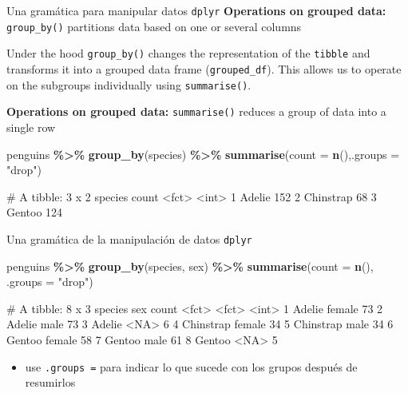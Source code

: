\documentclass[
  ignorenonframetext,
  aspectratio=169]{beamer}
\newenvironment{Shaded}{\begin{snugshade}}{\end{snugshade}}
\newcommand{\AttributeTok}[1]{\textcolor[rgb]{0.13,0.29,0.53}{#1}}
\newcommand{\FunctionTok}[1]{\textcolor[rgb]{0.13,0.29,0.53}{\textbf{#1}}}
\newcommand{\NormalTok}[1]{#1}
\newcommand{\SpecialCharTok}[1]{\textcolor[rgb]{0.81,0.36,0.00}{\textbf{#1}}}
\newcommand{\StringTok}[1]{\textcolor[rgb]{0.31,0.60,0.02}{#1}}
\providecommand{\tightlist}{%
  \setlength{\itemsep}{0pt}\setlength{\parskip}{0pt}}
\let\oldverbatim\verbatim
\let\endoldverbatim\endverbatim
\renewenvironment{verbatim}{\tiny\oldverbatim}{\endoldverbatim}
\begin{document}
\begin{frame}[fragile]{Una gramática para manipular datos
\texttt{dplyr}}
\label{una-gramuxe1tica-para-manipular-datos-dplyr-5}
\textbf{Operations on grouped data:} \texttt{group\_by()} partitions
data based on one or several columns

Under the hood \texttt{group\_by()} changes the representation of the
\texttt{tibble} and transforms it into a grouped data frame
(\texttt{grouped\_df}). This allows us to operate on the subgroups
individually using \texttt{summarise()}.

\textbf{Operations on grouped data:} \texttt{summarise()} reduces a
group of data into a single row

\begin{Shaded}
\begin{Highlighting}[]
\NormalTok{penguins }\SpecialCharTok{\%\textgreater{}\%} \FunctionTok{group\_by}\NormalTok{(species) }\SpecialCharTok{\%\textgreater{}\%} 
  \FunctionTok{summarise}\NormalTok{(}\AttributeTok{count =} \FunctionTok{n}\NormalTok{(),}\AttributeTok{.groups =} \StringTok{"drop"}\NormalTok{)}
\end{Highlighting}
\end{Shaded}

\begin{verbatim}
# A tibble: 3 x 2
  species   count
  <fct>     <int>
1 Adelie      152
2 Chinstrap    68
3 Gentoo      124
\end{verbatim}
\end{frame}

\begin{frame}[fragile]{Una gramática de la manipulación de datos
\texttt{dplyr}}
\label{una-gramuxe1tica-de-la-manipulaciuxf3n-de-datos-dplyr-29}
\begin{Shaded}
\begin{Highlighting}[]
\NormalTok{penguins }\SpecialCharTok{\%\textgreater{}\%} \FunctionTok{group\_by}\NormalTok{(species, sex) }\SpecialCharTok{\%\textgreater{}\%}
  \FunctionTok{summarise}\NormalTok{(}\AttributeTok{count =} \FunctionTok{n}\NormalTok{(), }\AttributeTok{.groups =} \StringTok{"drop"}\NormalTok{)}
\end{Highlighting}
\end{Shaded}

\begin{verbatim}
# A tibble: 8 x 3
  species   sex    count
  <fct>     <fct>  <int>
1 Adelie    female    73
2 Adelie    male      73
3 Adelie    <NA>       6
4 Chinstrap female    34
5 Chinstrap male      34
6 Gentoo    female    58
7 Gentoo    male      61
8 Gentoo    <NA>       5
\end{verbatim}

\begin{itemize}
\tightlist
\item
  use \texttt{.groups\ =} para indicar lo que sucede con los grupos
  después de resumirlos
\end{itemize}
\end{frame}
\end{document}
